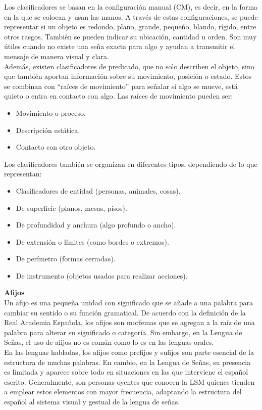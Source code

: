 Los clasificadores se basan en la configuración manual (CM), es decir, en la forma en la que se colocan y usan las manos. A través de estas configuraciones, se puede representar si un objeto es redondo, plano, grande, pequeño, blando, rígido, entre otros rasgos. También se pueden indicar su ubicación, cantidad u orden. Son muy útiles cuando no existe una seña exacta para algo y ayudan a transmitir el mensaje de manera visual y clara.\\

Además, existen clasificadores de predicado, que no solo describen el objeto, sino que también aportan información sobre su movimiento, posición o estado. Estos se combinan con “raíces de movimiento” para señalar si algo se mueve, está quieto o entra en contacto con algo. Las raíces de movimiento pueden ser:
\begin{itemize}
    \item Movimiento o proceso.
    \item Descripción estática.
    \item Contacto con otro objeto.
\end{itemize}

Los clasificadores también se organizan en diferentes tipos, dependiendo de lo que representan:
\begin{itemize}
    \item Clasificadores de entidad (personas, animales, cosas).
    \item De superficie (planos, mesas, pisos).
    \item De profundidad y anchura (algo profundo o ancho).
    \item De extensión o límites (como bordes o extremos).
    \item De perímetro (formas cerradas).
    \item De instrumento (objetos usados para realizar acciones).
\end{itemize}

\textbf{Afijos}\\
Un afijo es una pequeña unidad con significado que se añade a una palabra para cambiar su sentido o su función gramatical. De acuerdo con la definición de la Real Academia Española, los afijos son morfemas que se agregan a la raíz de una palabra para alterar su significado o categoría. Sin embargo, en la Lengua de Señas, el uso de afijos no es común como lo es en las lenguas orales.\\

En las lenguas habladas, los afijos como prefijos y sufijos son parte esencial de la estructura de muchas palabras. En cambio, en la Lengua de Señas, su presencia es limitada y aparece sobre todo en situaciones en las que interviene el español escrito. Generalmente, son personas oyentes que conocen la LSM quienes tienden a emplear estos elementos con mayor frecuencia, adaptando la estructura del español al sistema visual y gestual de la lengua de señas.\\

